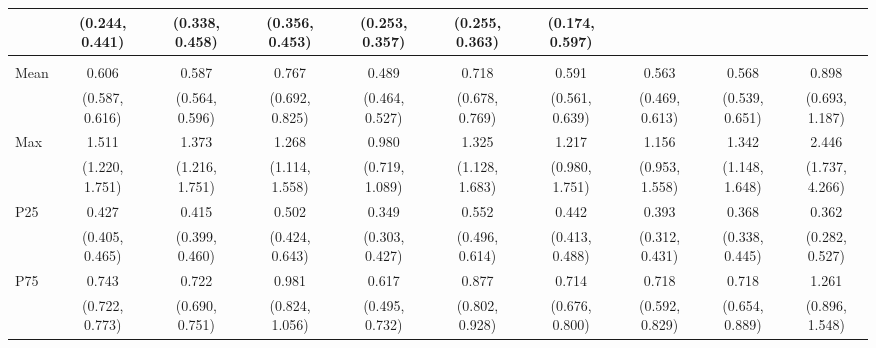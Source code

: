 {\begin{tabular}{l|c|c|c|c|c|c|c|c|c}
& {\scriptsize (0.244, 0.441)}
& {\scriptsize (0.338, 0.458)}
& {\scriptsize (0.356, 0.453)}
& {\scriptsize (0.253, 0.357)}
& {\scriptsize (0.255, 0.363)}
& {\scriptsize (0.174, 0.597)}
\\ [0.1cm]
\hline
\noalign{\smallskip}
\multicolumn{10}{l}{\textbf{Effect with Leads and Lags}} \\
\noalign{\smallskip}
\hline
Mean
& 0.606 & 0.587 & 0.767 & 0.489 & 0.718 & 0.591 & 0.563 & 0.568 & 0.898 \\
& {\scriptsize (0.587, 0.616)}
& {\scriptsize (0.564, 0.596)}
& {\scriptsize (0.692, 0.825)}
& {\scriptsize (0.464, 0.527)}
& {\scriptsize (0.678, 0.769)}
& {\scriptsize (0.561, 0.639)}
& {\scriptsize (0.469, 0.613)}
& {\scriptsize (0.539, 0.651)}
& {\scriptsize (0.693, 1.187)}
\\ [0.1cm]
\hline
Max
& 1.511 & 1.373 & 1.268 & 0.980 & 1.325 & 1.217 & 1.156 & 1.342 & 2.446 \\
& {\scriptsize (1.220, 1.751)}
& {\scriptsize (1.216, 1.751)}
& {\scriptsize (1.114, 1.558)}
& {\scriptsize (0.719, 1.089)}
& {\scriptsize (1.128, 1.683)}
& {\scriptsize (0.980, 1.751)}
& {\scriptsize (0.953, 1.558)}
& {\scriptsize (1.148, 1.648)}
& {\scriptsize (1.737, 4.266)}
\\ [0.1cm]
\hline
P25
& 0.427 & 0.415 & 0.502 & 0.349 & 0.552 & 0.442 & 0.393 & 0.368 & 0.362 \\
& {\scriptsize (0.405, 0.465)}
& {\scriptsize (0.399, 0.460)}
& {\scriptsize (0.424, 0.643)}
& {\scriptsize (0.303, 0.427)}
& {\scriptsize (0.496, 0.614)}
& {\scriptsize (0.413, 0.488)}
& {\scriptsize (0.312, 0.431)}
& {\scriptsize (0.338, 0.445)}
& {\scriptsize (0.282, 0.527)}
\\ [0.1cm]
\hline
P75
& 0.743 & 0.722 & 0.981 & 0.617 & 0.877 & 0.714 & 0.718 & 0.718 & 1.261 \\
& {\scriptsize (0.722, 0.773)}
& {\scriptsize (0.690, 0.751)}
& {\scriptsize (0.824, 1.056)}
& {\scriptsize (0.495, 0.732)}
& {\scriptsize (0.802, 0.928)}
& {\scriptsize (0.676, 0.800)}
& {\scriptsize (0.592, 0.829)}
& {\scriptsize (0.654, 0.889)}
& {\scriptsize (0.896, 1.548)}
\\ [0.1cm]
\hline
\hline
\end{tabular}
}
